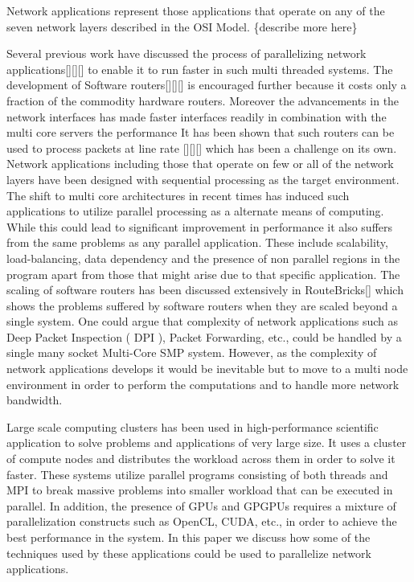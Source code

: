 \documentclass[conference]{IEEEtran}
\begin{document}
Network applications represent those applications that operate on any of the seven network layers described in the OSI Model. \{describe more here\}

Several previous work have discussed the process of parallelizing network applications[][][] to enable it to run faster in such multi threaded systems. The development of Software routers[][][] is encouraged further because it costs only a fraction of the commodity hardware routers. Moreover the advancements in the network interfaces has made faster interfaces readily in combination with the multi core servers the performance  It has been shown that such routers can be used to process packets at line rate [][][] which has been a challenge on its own. Network applications including those that operate on few or all of the network layers have been designed with sequential processing as the target environment. The shift to multi core architectures in recent times has induced such applications to utilize parallel processing as a alternate means of computing. While this could lead to significant improvement in performance it also suffers from the same problems as any parallel application. These include scalability, load-balancing, data dependency and the presence of non parallel regions in the program apart from those that might arise due to that specific application. The scaling of software routers has been discussed extensively in RouteBricks[] which shows the problems suffered by software routers when they are scaled beyond a single system. One could argue that complexity of network applications such as Deep Packet Inspection ( DPI ), Packet Forwarding, etc., could be handled by a single many socket Multi-Core SMP system. However, as the complexity of network applications develops it would be inevitable but to move to a multi node environment in order to perform the computations and to handle more network bandwidth.

Large scale computing clusters has been used in high-performance scientific application to solve problems and applications of very large size. It uses a cluster of compute nodes and distributes the workload across them in order to solve it faster. These systems utilize parallel programs consisting of both threads and MPI to break massive problems into smaller workload that can be executed in parallel. In addition, the presence of GPUs and GPGPUs requires a mixture of parallelization constructs such as OpenCL, CUDA, etc., in order to achieve the best performance in the system. In this paper we discuss how some of the techniques used by these applications could be used to parallelize network applications.
\end{document}
